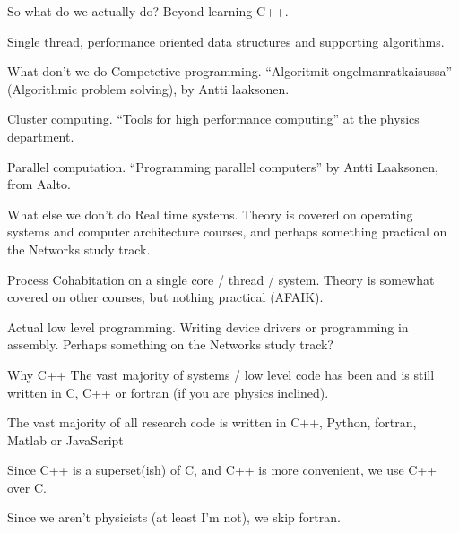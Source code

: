 \documentclass[11pt, aspectratio=169, table]{beamer}
\begin{document}
\begin{frame}{So what do we actually do?}
\setlength\parskip{\fill}
Beyond learning C++.\pause

Single thread, performance oriented data structures and supporting algorithms.
\end{frame}

\begin{frame}{What don't we do}
\setlength\parskip{\fill}\pause
Competetive programming. ``Algoritmit ongelmanratkaisussa'' (Algorithmic problem solving), by Antti laaksonen.

Cluster computing. ``Tools for high performance computing'' at the physics department.

Parallel computation. ``Programming parallel computers'' by Antti Laaksonen, from Aalto.
\end{frame}

\begin{frame}{What else we don't do}
\setlength\parskip{\fill}\pause
Real time systems. Theory is covered on operating systems and computer architecture courses, and perhaps something practical 
on the Networks study track.

Process Cohabitation on a single core / thread / system. Theory is somewhat covered on other courses, but nothing practical (AFAIK).

Actual low level programming. Writing device drivers or programming in assembly. Perhaps something on the Networks study track?
\end{frame}

\begin{frame}{Why C++}
\setlength\parskip{\fill}\pause
The vast majority of systems / low level code has been and is still written in C, C++ or fortran (if you are physics inclined).

The vast majority of all research code is written in C++, Python, fortran, Matlab or JavaScript

Since C++ is a superset(\alert{ish}) of C, and C++ is more convenient, we use C++ over C.

Since we aren't physicists (at least I'm not), we skip fortran.
\end{frame}
\end{document}
